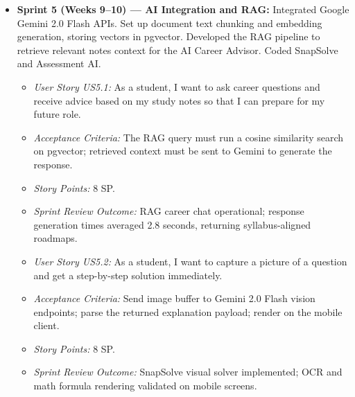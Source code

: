 \documentclass[12,Times new Roman,a4paper]{report}
\begin{document}
\begin{itemize}
    \item \textbf{Sprint 5 (Weeks 9--10) --- AI Integration and RAG:} Integrated Google Gemini 2.0 Flash APIs. Set up document text chunking and embedding generation, storing vectors in pgvector. Developed the RAG pipeline to retrieve relevant notes context for the AI Career Advisor. Coded SnapSolve and Assessment AI.
    \begin{itemize}
        \item \textit{User Story US5.1:} As a student, I want to ask career questions and receive advice based on my study notes so that I can prepare for my future role.
        \item \textit{Acceptance Criteria:} The RAG query must run a cosine similarity search on pgvector; retrieved context must be sent to Gemini to generate the response.
        \item \textit{Story Points:} 8 SP.
        \item \textit{Sprint Review Outcome:} RAG career chat operational; response generation times averaged 2.8 seconds, returning syllabus-aligned roadmaps.
    \end{itemize}
    \begin{itemize}
        \item \textit{User Story US5.2:} As a student, I want to capture a picture of a question and get a step-by-step solution immediately.
        \item \textit{Acceptance Criteria:} Send image buffer to Gemini 2.0 Flash vision endpoints; parse the returned explanation payload; render on the mobile client.
        \item \textit{Story Points:} 8 SP.
        \item \textit{Sprint Review Outcome:} SnapSolve visual solver implemented; OCR and math formula rendering validated on mobile screens.
    \end{itemize}
    

\end{itemize}
\end{document}
